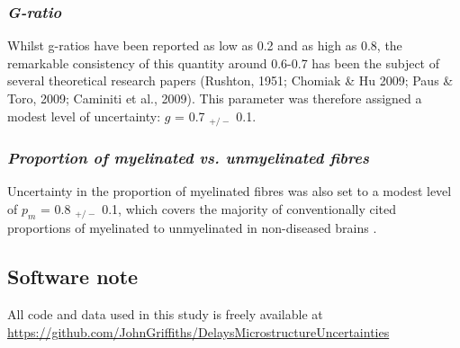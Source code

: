 
\subsubsection*{\textit{G-ratio}}

Whilst g-ratios have been reported as low as 0.2 and as high as 0.8, the
remarkable consistency of this quantity around 0.6-0.7 has been the
subject of several theoretical research papers (Rushton, 1951; Chomiak
\& Hu 2009; Paus \& Toro, 2009; Caminiti et al., 2009). This parameter
was therefore assigned a modest level of uncertainty: $g$ = 0.7 $_{+/-}$
0.1. 

\subsubsection*{\textit{Proportion of myelinated vs. unmyelinated fibres}}

Uncertainty in the proportion of myelinated fibres was
also set to a modest level of $p_{m}$ = 0.8 $_{+/-}$ 0.1, which covers
the majority of conventionally cited proportions of myelinated to
unmyelinated in non-diseased brains  \cite{bowley2010age}.

 
\subsection{Software note}

All code and data used in this study is freely available at \url{https://github.com/JohnGriffiths/DelaysMicrostructureUncertainties} 

